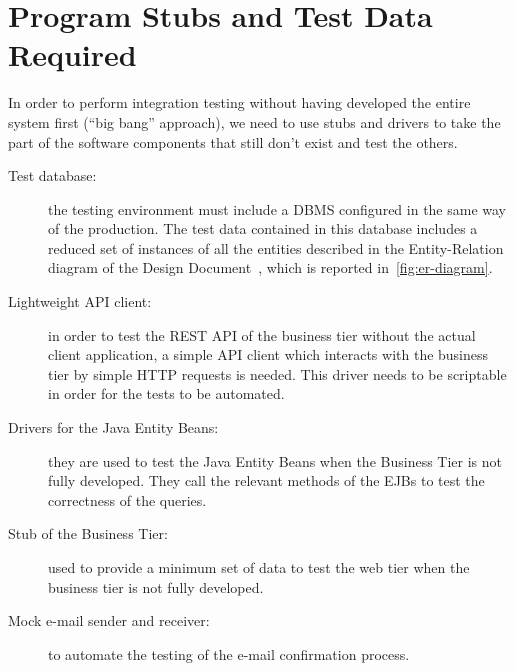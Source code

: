 \chapter{Program Stubs and Test Data Required}
\label{chap:stubs}

In order to perform integration testing without having developed the entire system first (``big bang'' approach), we need to use stubs and drivers to take the part of the software components that still don't exist and test the others.

\begin{description}
    \item[Test database:] the testing environment must include a DBMS configured in the same way of the production. The test data contained in this database includes a reduced set of instances of all the entities described in the Entity-Relation diagram of the Design Document~\cite[p.~10]{mytaxi-dd}, which is reported in~\autoref{fig:er-diagram}.

    \item[Lightweight API client:] in order to test the REST API of the business tier without the actual client application, a simple API client which interacts with the business tier by simple HTTP requests is needed. This driver needs to be scriptable in order for the tests to be automated.

    \item[Drivers for the Java Entity Beans:] they are used to test the Java Entity Beans when the Business Tier is not fully developed. They call the relevant methods of the EJBs to test the correctness of the queries.

    \item[Stub of the Business Tier:] used to provide a minimum set of data to test the web tier when the business tier is not fully developed.

    \item[Mock e-mail sender and receiver:] to automate the testing of the e-mail confirmation process.
\end{description}

